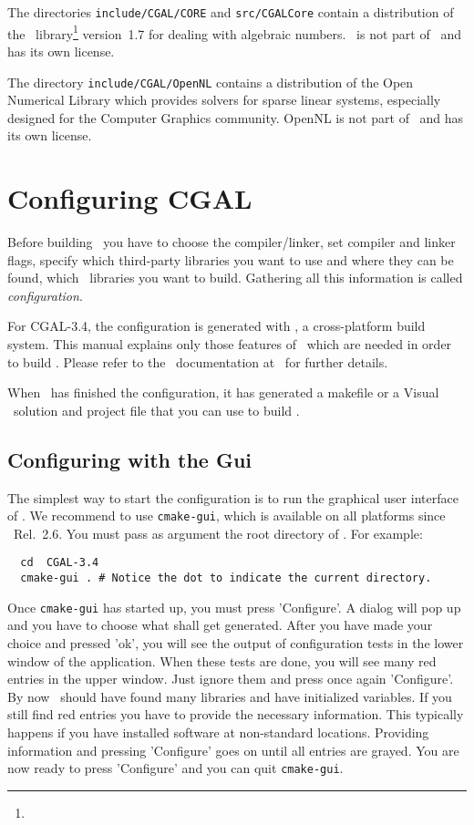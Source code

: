 The directories \texttt{include/CGAL/CORE} and \texttt{src/CGALCore} contain a
distribution of the \core\ library\footnote{\corepage} version~1.7 for
dealing with algebraic numbers. \core\ is not part of \cgal\ and has its own license.


The directory \texttt{include/CGAL/OpenNL} contains a distribution of the 
Open Numerical Library which provides solvers for sparse linear systems, especially designed 
for the Computer Graphics community. OpenNL is not part of \cgal\ and has its own license.

\section{Configuring CGAL}

Before building \cgal\ you have to choose the compiler/linker, 
set compiler and linker  flags, specify which
third-party libraries you want to use and where they can be found, 
which \cgal\ libraries you want to build. Gathering
all this information is called {\em configuration}. 

For CGAL-3.4, the configuration is generated with \cmake, a
cross-platform build system.  This manual explains only those features of
\cmake\ which are needed in order to build \cgal. Please refer to the \cmake\ 
documentation at \cmakepage\ for further details.

When \cmake\ has finished the configuration, it has generated
a makefile or a Visual \CC\  solution and project file that you 
can use to build \cgal.

\subsection{Configuring \cgal{} with the \cmake{} {\sc Gui} }

The simplest way to start the configuration is to run the graphical
user interface of \cmake. We recommend to use \texttt{cmake-gui}, which
is available on all platforms since \cmake\ Rel.~2.6.   You must pass as 
argument the root directory of \cgal. For example:

{\ccTexHtml{\scriptsize}{}
\begin{verbatim}
  cd  CGAL-3.4
  cmake-gui . # Notice the dot to indicate the current directory.
\end{verbatim}
}

Once \texttt{cmake-gui} has started up, you must press 'Configure'. 
A dialog will pop up and you have to choose what shall get generated.
After you have made your choice and pressed 'ok', you will see
the output of configuration tests in the lower window of the application. 
When these tests are done, you will see many
red entries in the upper window. Just ignore them and  press once again  'Configure'. 
By now \cmake\ should have found many libraries and have initialized variables. 
If you still find red entries you have to provide the necessary information. 
This typically happens if you have installed software at non-standard locations.
Providing information and pressing 'Configure' goes on until 
all entries are grayed. You are now ready to press 'Configure' and you
can quit \texttt{cmake-gui}.

